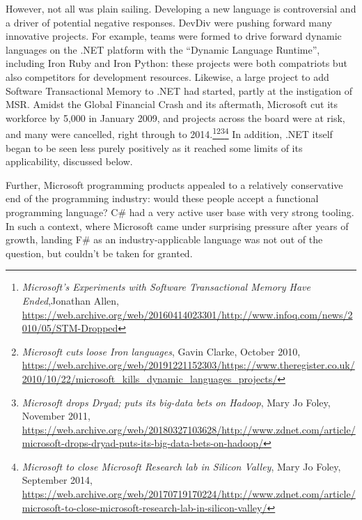 \documentclass[acmsmall]{acmart}\settopmatter{}
\begin{document}
However, not all was plain sailing.  Developing a new language is controversial and a driver of potential
negative responses. DevDiv were pushing forward many innovative projects. For example, teams
were formed to drive forward dynamic languages on the .NET platform with the “Dynamic Language Runtime”, including
Iron Ruby and Iron Python: these projects were both compatriots but also competitors for development
resources. Likewise, a large project to add Software Transactional Memory to .NET had started, partly
at the instigation of MSR. Amidst the Global Financial Crash and its aftermath, Microsoft cut its workforce
by 5,000 in January 2009, and projects across the board were at risk, and many were cancelled, right
through to 2014.\footnote{\textit{Microsoft’s Experiments with Software Transactional Memory Have Ended},Jonathan Allen, \url{https://web.archive.org/web/20160414023301/http://www.infoq.com/news/2010/05/STM-Dropped}}\footnote{\textit{Microsoft cuts loose Iron languages}, Gavin Clarke, October 2010, \url{https://web.archive.org/web/20191221152303/https://www.theregister.co.uk/2010/10/22/microsoft_kills_dynamic_languages_projects/}}\footnote{\textit{Microsoft drops Dryad; puts its big-data bets on Hadoop}, Mary Jo Foley, November 2011,  \url{https://web.archive.org/web/20180327103628/http://www.zdnet.com/article/microsoft-drops-dryad-puts-its-big-data-bets-on-hadoop/}}\footnote{\textit{Microsoft to close Microsoft Research lab in Silicon Valley}, Mary Jo Foley, September 2014, \url{https://web.archive.org/web/20170719170224/http://www.zdnet.com/article/microsoft-to-close-microsoft-research-lab-in-silicon-valley/}}
In addition, .NET itself began to be seen less purely positively as it reached some limits of its applicability, discussed below.

Further, Microsoft programming products appealed to a relatively conservative end of the programming industry: would
these people accept a functional programming language? C\# had a very active user base with very strong tooling. In
such a context, where Microsoft came under surprising pressure after years of growth, landing F\# as an industry-applicable
language was not out of the question, but couldn’t be taken for granted.
\end{document}
